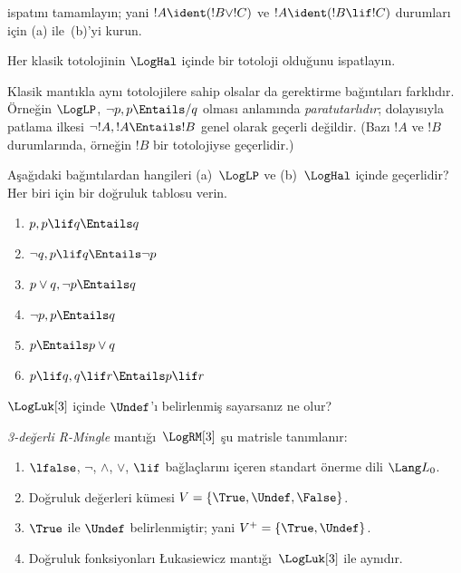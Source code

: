 \begin{prob}
   ispatını tamamlayın; yani
  $!A \ident (!B \lor !C)$ ve $!A \ident (!B \lif !C)$ durumları için
  (a) ile~(b)'yi kurun.
\end{prob}

\begin{prob}
Her klasik totolojinin $\LogHal$ içinde bir totoloji olduğunu ispatlayın.
\end{prob}

Klasik mantıkla aynı totolojilere sahip olsalar da gerektirme bağıntıları
farklıdır. Örneğin $\LogLP$, $\lnot p, p \Entails/ q$ olması anlamında
\emph{paratutarlıdır}; dolayısıyla patlama ilkesi
$\lnot !A, !A \Entails !B$ genel olarak geçerli değildir. (Bazı $!A$ ve
$!B$ durumlarında, örneğin $!B$ bir totolojiyse geçerlidir.)

\begin{prob}
  Aşağıdaki bağıntılardan hangileri (a)~$\LogLP$ ve
  (b)~$\LogHal$ içinde geçerlidir? Her biri için bir doğruluk tablosu verin.
  \begin{enumerate}
    \item $p, p \lif q \Entails q$
    \item $\lnot q, p \lif q \Entails \lnot p$
    \item $p \lor q, \lnot p \Entails q$
    \item $\lnot p, p \Entails q$
    \item $p \Entails p \lor q$
    \item $p \lif q, q\lif r \Entails p \lif r$
  \end{enumerate}
\end{prob}

$\LogLuk[3]$ içinde $\Undef$'ı belirlenmiş sayarsanız ne olur?

\begin{defn}
  \emph{3-değerli R-Mingle} mantığı~$\LogRM[3]$ şu matrisle tanımlanır:
  \begin{enumerate}
    \item $\lfalse$, $\lnot$, $\land$, $\lor$, $\lif$ bağlaçlarını içeren
    standart önerme dili $\Lang L_0$.
    \item Doğruluk değerleri kümesi $V = \{\True, \Undef, \False\}$.
    \item $\True$ ile $\Undef$ belirlenmiştir; yani
    $V^+ = \{\True, \Undef\}$.
    \item Doğruluk fonksiyonları \L ukasiewicz mantığı~$\LogLuk[3]$ ile
    aynıdır.
  \end{enumerate}
\end{defn}

